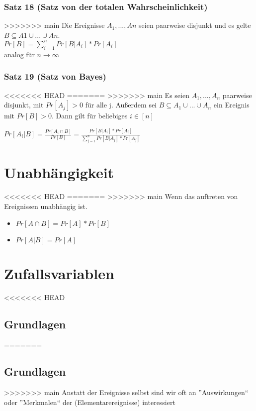 \documentclass[11pt]{article}
\begin{document}
\begin{enumerate}
\subsubsection{Satz 18 (Satz von der totalen Wahrscheinlichkeit)}
\label{sec:orga4739d7}
>>>>>>> main
Die Ereignisse \(A_1, ..., An\) seien paarweise disjunkt und es gelte \(B \subseteq A1 \cup ... \cup An\). \\
\(Pr[B] = \sum_{i=1}^n Pr[B|A_i] * Pr[A_i]\) \\
analog für \(n \rightarrow \infty\)

\subsubsection{Satz 19 (Satz von Bayes)}
<<<<<<< HEAD
\label{sec:org988fd8f}
=======
\label{sec:org31ff9bf}
>>>>>>> main
Es seien \(A_1, ..., A_n\) paarweise disjunkt, mit \(Pr[A_j] > 0\) für alle j.
Außerdem sei \(B \subseteq A_1 \cup ... \cup A_n\) ein Ereignis mit \(Pr[B]>0\).
Dann gilt für beliebiges \(i \in [n]\)

\(Pr[A_i|B] = \frac{Pr[A_i \cap B]}{Pr[B]} = \frac{Pr[B|A_i] * Pr[A_i]}{\sum_{j=1}^n Pr[B|A_j] * Pr[A_j]}\)

\section{Unabhängigkeit}
<<<<<<< HEAD
\label{sec:orgd266003}
=======
\label{sec:orgf950dc7}
>>>>>>> main
Wenn das auftreten von Ereignissen unabhängig ist.
\begin{itemize}
\item \(Pr[A \cap B] = Pr[A] * Pr[B]\)
\item \(Pr[A|B] = Pr[A]\)
\end{itemize}

\section{Zufallsvariablen}
<<<<<<< HEAD
\label{sec:org5a1a35e}

\subsection{Grundlagen}
\label{sec:orgecbfcf2}
=======
\label{sec:orge7fe052}

\subsection{Grundlagen}
\label{sec:orgee8e0af}
>>>>>>> main
Anstatt der Ereignisse selbst sind wir oft an ”Auswirkungen“ oder ”Merkmalen“ der (Elementarereignisse) interessiert


\end{enumerate}
\end{document}
